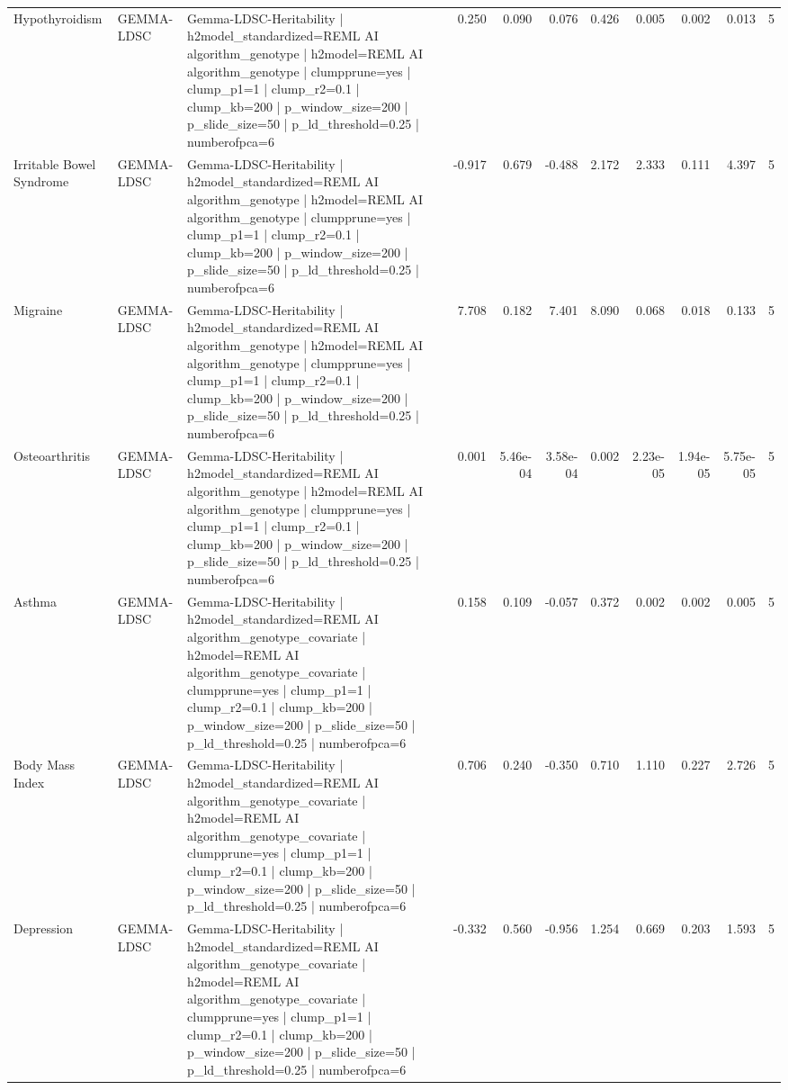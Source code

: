 \begin{landscape}
\begin{longtable}{p{2.4cm}p{1.8cm}p{6.0cm}rrrrrrrr}
Hypothyroidism & GEMMA-LDSC & Gemma-LDSC-Heritability | h2model\_standardized=REML AI algorithm\_genotype | h2model=REML AI algorithm\_genotype | clumpprune=yes | clump\_p1=1 | clump\_r2=0.1 | clump\_kb=200 | p\_window\_size=200 | p\_slide\_size=50 | p\_ld\_threshold=0.25 | numberofpca=6 & 0.250 & 0.090 & 0.076 & 0.426 & 0.005 & 0.002 & 0.013 & 5 \\
Irritable Bowel Syndrome & GEMMA-LDSC & Gemma-LDSC-Heritability | h2model\_standardized=REML AI algorithm\_genotype | h2model=REML AI algorithm\_genotype | clumpprune=yes | clump\_p1=1 | clump\_r2=0.1 | clump\_kb=200 | p\_window\_size=200 | p\_slide\_size=50 | p\_ld\_threshold=0.25 | numberofpca=6 & -0.917 & 0.679 & -0.488 & 2.172 & 2.333 & 0.111 & 4.397 & 5 \\
Migraine & GEMMA-LDSC & Gemma-LDSC-Heritability | h2model\_standardized=REML AI algorithm\_genotype | h2model=REML AI algorithm\_genotype | clumpprune=yes | clump\_p1=1 | clump\_r2=0.1 | clump\_kb=200 | p\_window\_size=200 | p\_slide\_size=50 | p\_ld\_threshold=0.25 | numberofpca=6 & 7.708 & 0.182 & 7.401 & 8.090 & 0.068 & 0.018 & 0.133 & 5 \\
Osteoarthritis & GEMMA-LDSC & Gemma-LDSC-Heritability | h2model\_standardized=REML AI algorithm\_genotype | h2model=REML AI algorithm\_genotype | clumpprune=yes | clump\_p1=1 | clump\_r2=0.1 | clump\_kb=200 | p\_window\_size=200 | p\_slide\_size=50 | p\_ld\_threshold=0.25 | numberofpca=6 & 0.001 & 5.46e-04 & 3.58e-04 & 0.002 & 2.23e-05 & 1.94e-05 & 5.75e-05 & 5 \\
Asthma & GEMMA-LDSC & Gemma-LDSC-Heritability | h2model\_standardized=REML AI algorithm\_genotype\_covariate | h2model=REML AI algorithm\_genotype\_covariate | clumpprune=yes | clump\_p1=1 | clump\_r2=0.1 | clump\_kb=200 | p\_window\_size=200 | p\_slide\_size=50 | p\_ld\_threshold=0.25 | numberofpca=6 & 0.158 & 0.109 & -0.057 & 0.372 & 0.002 & 0.002 & 0.005 & 5 \\
Body Mass Index & GEMMA-LDSC & Gemma-LDSC-Heritability | h2model\_standardized=REML AI algorithm\_genotype\_covariate | h2model=REML AI algorithm\_genotype\_covariate | clumpprune=yes | clump\_p1=1 | clump\_r2=0.1 | clump\_kb=200 | p\_window\_size=200 | p\_slide\_size=50 | p\_ld\_threshold=0.25 | numberofpca=6 & 0.706 & 0.240 & -0.350 & 0.710 & 1.110 & 0.227 & 2.726 & 5 \\
Depression & GEMMA-LDSC & Gemma-LDSC-Heritability | h2model\_standardized=REML AI algorithm\_genotype\_covariate | h2model=REML AI algorithm\_genotype\_covariate | clumpprune=yes | clump\_p1=1 | clump\_r2=0.1 | clump\_kb=200 | p\_window\_size=200 | p\_slide\_size=50 | p\_ld\_threshold=0.25 | numberofpca=6 & -0.332 & 0.560 & -0.956 & 1.254 & 0.669 & 0.203 & 1.593 & 5 \\

\end{longtable}
\end{landscape}
